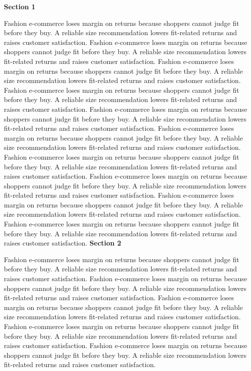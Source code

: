 \documentclass[a4paper,11pt]{article}
\begin{document}
{\headfont\bfseries\Large Section 1}\par\medskip
Fashion e-commerce loses margin on returns because shoppers cannot judge fit before they buy. A reliable size recommendation lowers fit-related returns and raises customer satisfaction. Fashion e-commerce loses margin on returns because shoppers cannot judge fit before they buy. A reliable size recommendation lowers fit-related returns and raises customer satisfaction. Fashion e-commerce loses margin on returns because shoppers cannot judge fit before they buy. A reliable size recommendation lowers fit-related returns and raises customer satisfaction. Fashion e-commerce loses margin on returns because shoppers cannot judge fit before they buy. A reliable size recommendation lowers fit-related returns and raises customer satisfaction. Fashion e-commerce loses margin on returns because shoppers cannot judge fit before they buy. A reliable size recommendation lowers fit-related returns and raises customer satisfaction. 
Fashion e-commerce loses margin on returns because shoppers cannot judge fit before they buy. A reliable size recommendation lowers fit-related returns and raises customer satisfaction. Fashion e-commerce loses margin on returns because shoppers cannot judge fit before they buy. A reliable size recommendation lowers fit-related returns and raises customer satisfaction. Fashion e-commerce loses margin on returns because shoppers cannot judge fit before they buy. A reliable size recommendation lowers fit-related returns and raises customer satisfaction. Fashion e-commerce loses margin on returns because shoppers cannot judge fit before they buy. A reliable size recommendation lowers fit-related returns and raises customer satisfaction. Fashion e-commerce loses margin on returns because shoppers cannot judge fit before they buy. A reliable size recommendation lowers fit-related returns and raises customer satisfaction. \newpage
{\headfont\bfseries\Large Section 2}\par\medskip
Fashion e-commerce loses margin on returns because shoppers cannot judge fit before they buy. A reliable size recommendation lowers fit-related returns and raises customer satisfaction. Fashion e-commerce loses margin on returns because shoppers cannot judge fit before they buy. A reliable size recommendation lowers fit-related returns and raises customer satisfaction. Fashion e-commerce loses margin on returns because shoppers cannot judge fit before they buy. A reliable size recommendation lowers fit-related returns and raises customer satisfaction. Fashion e-commerce loses margin on returns because shoppers cannot judge fit before they buy. A reliable size recommendation lowers fit-related returns and raises customer satisfaction. Fashion e-commerce loses margin on returns because shoppers cannot judge fit before they buy. A reliable size recommendation lowers fit-related returns and raises customer satisfaction. 
\end{document}
